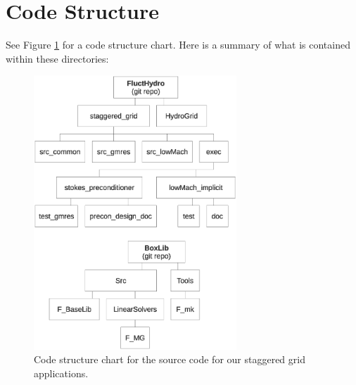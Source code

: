 \documentclass[final]{siamltex}
\begin{document}
\section{Code Structure}
See Figure \ref{fig:flowchart} for a code structure chart.  Here is a summary
of what is contained within these directories:\\
\begin{figure}[tb]
\centering
\includegraphics[width=3in]{flowchart}
\caption{Code structure chart for the source code for our staggered grid applications.}\label{fig:flowchart}
\end{figure}
\end{document}
